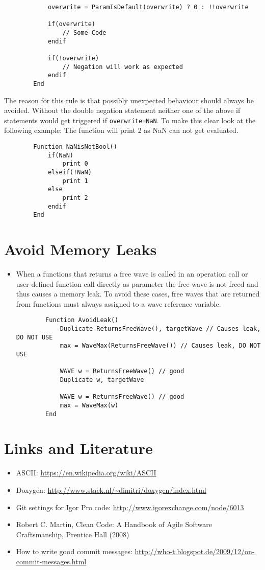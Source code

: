 \documentclass{scrartcl}
\begin{document}
\begin{itemize}
\begin{verbatim}
			overwrite = ParamIsDefault(overwrite) ? 0 : !!overwrite

			if(overwrite)
				// Some Code
			endif

			if(!overwrite)
				// Negation will work as expected
			endif
		End
	\end{verbatim}
	The reason for this rule is that possibly unexpected behaviour should always be avoided.
	Without the double negation statement neither one of the above if statements would get triggered if \texttt{overwrite=NaN}.\newline
	To make this clear look at the following example:
	The function will print 2 as NaN can not get evaluated.
	\begin{verbatim}
		Function NaNisNotBool()
			if(NaN)
				print 0
			elseif(!NaN)
				print 1
			else
				print 2
			endif
		End
	\end{verbatim}
\end{itemize}
%
\section{Avoid Memory Leaks}
%
\begin{itemize}
  \item When a functions that returns a free wave is called in an operation call or user-defined function call
directly as parameter the free wave is not freed and thus causes a memory leak.
To avoid these cases, free waves that are returned from functions must always assigned to a wave reference variable.
	\begin{verbatim}
		Function AvoidLeak()
			Duplicate ReturnsFreeWave(), targetWave // Causes leak, DO NOT USE
			max = WaveMax(ReturnsFreeWave()) // Causes leak, DO NOT USE

			WAVE w = ReturnsFreeWave() // good
			Duplicate w, targetWave

			WAVE w = ReturnsFreeWave() // good
			max = WaveMax(w)
		End
	\end{verbatim}
\end{itemize}

\section{Links and Literature}
%
\begin{itemize}
	\item ASCII: \url{https://en.wikipedia.org/wiki/ASCII}
%
	\item Doxygen: \url{http://www.stack.nl/~dimitri/doxygen/index.html}
%
	\item Git settings for Igor Pro code: \url{http://www.igorexchange.com/node/6013}
%
	\item Robert C. Martin, Clean Code: A Handbook of Agile Software Craftsmanship, Prentice Hall (2008)
%
	\item How to write good commit messages: \url{http://who-t.blogspot.de/2009/12/on-commit-messages.html}
\end{itemize}
%
\end{document}
